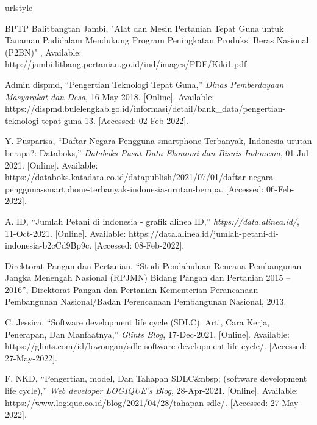 
\begin{thebibliography}{7}
%
\providecommand{\natexlab}[1]{#1}
\providecommand{\url}[1]{\texttt{#1}}
\expandafter\ifx\csname urlstyle\endcsname\relax
  \providecommand{\doi}[1]{doi: #1}\else
  \providecommand{\doi}{doi: \begingroup \urlstyle{rm}\Url}\fi


BPTP Balitbangtan Jambi, "Alat dan Mesin Pertanian Tepat Guna untuk Tanaman Padidalam Mendukung Program Peningkatan Produksi Beras Nasional (P2BN)"
, Available: http://jambi.litbang.pertanian.go.id/ind/images/PDF/Kiki1.pdf

Admin dispmd, “Pengertian Teknologi Tepat Guna,” \emph{Dinas Pemberdayaan Masyarakat dan Desa}, 16-May-2018. [Online]. Available: https://dispmd.bulelengkab.go.id/informasi/detail/bank\_data/pengertian-teknologi-tepat-guna-13. [Accessed: 02-Feb-2022]. 

Y. Pusparisa, “Daftar Negara Pengguna smartphone Terbanyak, Indonesia urutan berapa?: Databoks,” \emph{Databoks Pusat Data Ekonomi dan Bisnis Indonesia}, 01-Jul-2021. [Online]. Available: https://databoks.katadata.co.id/datapublish/2021/07/01/daftar-negara-pengguna-smartphone-terbanyak-indonesia-urutan-berapa. [Accessed: 06-Feb-2022]. 

A. ID, “Jumlah Petani di indonesia - grafik alinea ID,” \emph{https://data.alinea.id/}, 11-Oct-2021. [Online]. Available: https://data.alinea.id/jumlah-petani-di-indonesia-b2cCd9Bp9c. [Accessed: 08-Feb-2022]. 

Direktorat Pangan dan Pertanian, “Studi Pendahuluan Rencana Pembangunan Jangka Menengah Nasional (RPJMN) Bidang Pangan dan Pertanian 2015 – 2016”, Direktorat Pangan dan Pertanian Kementerian Perancanaan Pembangunan Nasional/Badan Perencanaan Pembangunan Nasional, 2013.

C. Jessica, “Software development life cycle (SDLC): Arti, Cara Kerja, Penerapan, Dan Manfaatnya,” \emph{Glints Blog}, 17-Dec-2021. [Online]. Available: https://glints.com/id/lowongan/sdlc-software-development-life-cycle/. [Accessed: 27-May-2022]. 

F. NKD, “Pengertian, model, Dan Tahapan SDLC\&nbsp; (software development life cycle),” \emph{Web developer LOGIQUE's Blog}, 28-Apr-2021. [Online]. Available: https://www.logique.co.id/blog/2021/04/28/tahapan-sdlc/. [Accessed: 27-May-2022]. 


\end{thebibliography}
